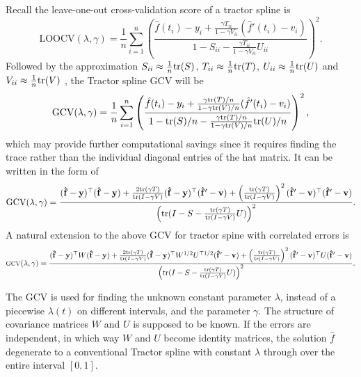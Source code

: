 Recall the leave-one-out cross-validation score of a tractor spline is 
\begin{equation*}
\mbox{LOOCV}(\lambda,\gamma)=\frac{1}{n}\sum_{i=1}^{n}\left( \frac{\hat{f}(t_i)-y_i+\frac{\gamma T_{ii}}{1-\gamma V_{ii}}(\hat{f}'(t_i)-v_i)}{1-S_{ii}-\frac{\gamma T_{ii}}{1-\gamma V_{ii}}U_{ii}} \right)^2.
\end{equation*}
Followed by the approximation $S_{ii}\approx\frac{1}{n}\mathrm{tr}(S)$, $T_{ii}\approx\frac{1}{n}\mathrm{tr}(T)$, $U_{ii}\approx\frac{1}{n}\mathrm{tr}(U)$ and $V_{ii}\approx\frac{1}{n}\mathrm{tr}(V)$ \cite{syed2011review}, the Tractor spline GCV will be 
\begin{equation*}
\mbox{GCV}(\lambda,\gamma)=\frac{1}{n}\sum_{i=1}^{n}\left( \frac{\hat{f}(t_i)-y_i+ \frac{\gamma\mathrm{tr}(T)/n}{1-\gamma \mathrm{tr}(V)/n}(\hat{f}'(t_i)-v_i)}{1-\mathrm{tr}(S)/n-\frac{\gamma\mathrm{tr}(T)/n}{1-\gamma \mathrm{tr}(V)/n} \mathrm{tr}(U)/n} \right)^2,
\end{equation*}
which may provide further computational savings since it requires finding the trace rather than the individual diagonal entries of the hat matrix. It can be written in the form of
\begin{equation*}
\mbox{GCV}(\lambda,\gamma)=\frac{(\mathbf{\hat{f}}-\mathbf{y})^\top (\mathbf{\hat{f}}-\mathbf{y})+\frac{2\mathrm{tr}(\gamma T)}{\mathrm{tr}(I-\gamma V)}(\mathbf{\hat{f}}-\mathbf{y})^\top (\mathbf{\hat{f}}'-\mathbf{v}) + \left( \frac{\mathrm{tr}(\gamma T)}{\mathrm{tr}(I-\gamma V)} \right)^2 (\mathbf{\hat{f}}'-\mathbf{v})^\top (\mathbf{\hat{f}}'-\mathbf{v})}{\left( \mathrm{tr}(I-S-\frac{\mathrm{tr}(\gamma T)}{\mathrm{tr}(I-\gamma V)}U) \right)^2}.
\end{equation*}
A natural extension to the above GCV for tractor spine with correlated errors is
\begin{equation}
\footnotesize
\mbox{GCV}(\lambda,\gamma)=\frac{(\mathbf{\hat{f}}-\mathbf{y})^\top W(\mathbf{\hat{f}}-\mathbf{y})+\frac{2\mathrm{tr}(\gamma T)}{\mathrm{tr}(I-\gamma V)}(\mathbf{\hat{f}}-\mathbf{y})^\top W^{1/2}U^{\top 1/2}(\mathbf{\hat{f}}'-\mathbf{v}) + \left( \frac{\mathrm{tr}(\gamma T)}{\mathrm{tr}(I-\gamma V)} \right)^2 (\mathbf{\hat{f}}'-\mathbf{v})^\top U(\mathbf{\hat{f}}'-\mathbf{v})}{\left( \mathrm{tr}(I-S-\frac{\mathrm{tr}(\gamma T)}{\mathrm{tr}(I-\gamma V)}U) \right)^2}.
\end{equation}
\normalsize


The GCV is used for finding the unknown constant parameter $\lambda$, instead of a piecewise $\lambda(t)$ on different intervals, and the parameter $\gamma$. The structure of covariance matrices $W$ and $U$ is supposed to be known. If the errors are independent, in which way $W$ and $U$ become identity matrices, the solution $\hat{f}$ degenerate to a conventional Tractor spline with constant $\lambda$ through over the entire interval $[0,1]$.  


